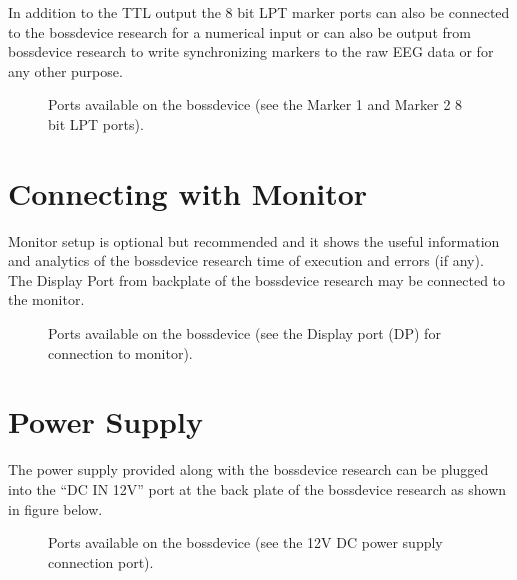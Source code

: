 \documentclass[letterpaper,10pt,english]{sphinxmanual}
\begin{document}
\sphinxAtStartPar
In addition to the TTL output the 8 bit LPT marker ports can also be connected to the bossdevice research for a numerical input or can also be output from bossdevice research to write synchronizing markers to the raw EEG data or for any other purpose.

\begin{figure}[htbp]
\centering
\capstart

\noindent{}
\caption{Ports available on the bossdevice (see the Marker 1 and Marker 2 8 bit LPT ports).}\label{\detokenize{2_setup_bossdevice_research:id6}}\end{figure}


\section{Connecting with Monitor}
\label{\detokenize{2_setup_bossdevice_research:connecting-with-monitor}}
\sphinxAtStartPar
Monitor setup is optional but recommended and it shows the useful information and analytics of the bossdevice research time of execution and errors (if any). The Display Port from backplate of the bossdevice research may be connected to the monitor.

\begin{figure}[htbp]
\centering
\capstart

\noindent{}
\caption{Ports available on the bossdevice (see the Display port (DP) for connection to monitor).}\label{\detokenize{2_setup_bossdevice_research:id7}}\end{figure}


\section{Power Supply}
\label{\detokenize{2_setup_bossdevice_research:power-supply}}
\sphinxAtStartPar
The power supply provided along with the bossdevice research can be plugged into the “DC IN 12V” port at the back plate of the bossdevice research as shown in figure below.

\begin{figure}[htbp]
\centering
\capstart

\noindent{}
\caption{Ports available on the bossdevice (see the 12V DC power supply connection port).}\label{\detokenize{2_setup_bossdevice_research:id8}}\end{figure}
\end{document}
